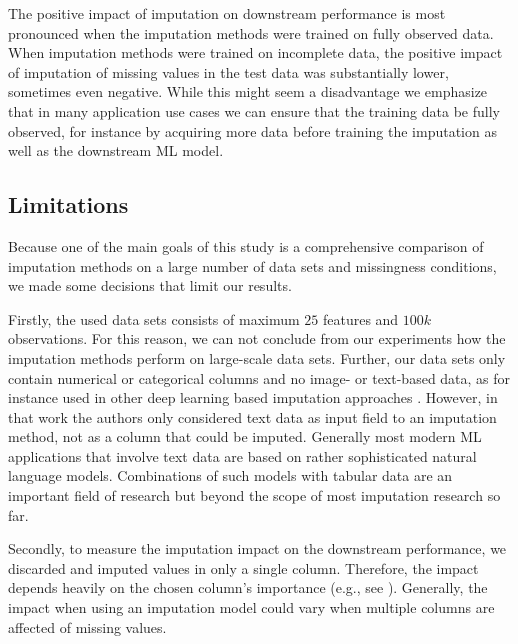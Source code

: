 The positive impact of imputation on downstream performance is most pronounced when the imputation methods were trained on fully observed data. When imputation methods were trained on incomplete data, the positive impact of imputation of missing values in the test data was substantially lower, sometimes even negative. While this might seem a disadvantage we emphasize that in many application use cases we can ensure that the training data be fully observed, for instance by acquiring more data before training the imputation as well as the downstream ML model.


\subsection{Limitations}
%
Because one of the main goals of this study is a comprehensive comparison of imputation methods on a large number of data sets and missingness conditions, we made some decisions that limit our results.

Firstly, the used data sets consists of maximum $25$ features and $100k$ observations. For this reason, we can not conclude from our experiments how the imputation methods perform on large-scale data sets. Further, our data sets only contain numerical or categorical columns and no image- or text-based data, as for instance used in other deep learning based imputation approaches \citep{Biessmann2018a}. However, in that work the authors only considered text data as input field to an imputation method, not as a column that could be imputed. Generally most modern ML applications that involve text data are based on rather sophisticated natural language models. Combinations of such models with tabular data are an important field of research \citep{Yin2020} but beyond the scope of most imputation research so far. 

Secondly, to measure the imputation impact on the downstream performance, we discarded and imputed values in only a single column. Therefore, the impact depends heavily on the chosen column's importance (e.g., see \cite{Jenga}). Generally, the impact when using an imputation model could vary when multiple columns are affected of missing values.
